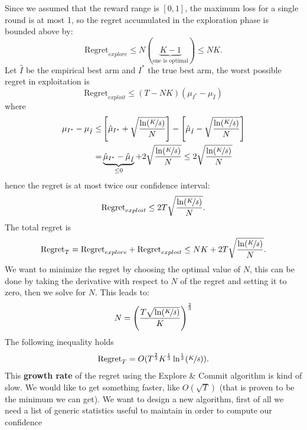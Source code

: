 \documentclass[10pt, a4paper]{report}
\begin{document}
Since we assumed that the reward range is $[0,1]$, the maximum loss for a single round is at most 1, so the regret accumulated in the exploration phase is bounded above by:\begin{equation}
     \text{Regret}_{explore}\le N(\underbrace{K-1}_{\text{one is optimal}})\le NK.
\end{equation}
Let $\hat I$ be the empirical best arm and $I^*$ the true best arm, the worst possible regret in exploitation is\begin{equation}
    \text{Regret}_{exploit}\le (T-NK)(\mu_{I^*}-\mu_{\hat I})
\end{equation}
where\begin{align}
    \mu_{I^*}-\mu_{\hat I}\le&
    \left[\hat \mu_{I^*}+\sqrt{\frac{\ln(\nicefrac{K}{\delta})}{N}}\right]-
     \left[\hat \mu_{\hat I}-\sqrt{\frac{\ln(\nicefrac{K}{\delta})}{N}}\right]\\ 
     =&\underbrace{\hat\mu_{I^*}-\hat\mu_{\hat I}}_{\le 0}+2\sqrt{\frac{\ln(\nicefrac{K}{\delta})}{N}}\le 2\sqrt{\frac{\ln(\nicefrac{K}{\delta})}{N}}
\end{align}
hence the regret is at most twice our confidence interval:\begin{equation}
    \text{Regret}_{exploit}\le2T\sqrt{\frac{\ln(\nicefrac{K}{\delta})}{N}}.
\end{equation}
The total regret is\begin{equation}
    \text{Regret}_T= \text{Regret}_{explore}+\text{Regret}_{exploit}\le NK+2T\sqrt{\frac{\ln(\nicefrac{K}{\delta})}{N}}.
\end{equation}
We want to minimize the regret by choosing the optimal value of $N$, this can be done by taking the derivative with respect to $N$ of the regret and setting it to zero, then we solve for $N$. This leads to:\begin{equation}
    N=\left(
        \frac{T\sqrt{\ln(\nicefrac{K}{\delta})}}{K}
    \right)^\frac{2}{3}
\end{equation}
The following inequality holds\begin{equation}
    \text{Regret}_T= O(T^\frac{2}{3}K^\frac{1}{3}\ln^\frac{1}{3}(\nicefrac{K}{\delta})).
\end{equation}
This \textbf{growth rate} of the regret using the Explore \& Commit algorithm is kind of slow. We would like to get something faster, like $O(\sqrt{T})$ (that is proven to be the minimum we can get). We want to design a new algorithm, first of all we need a list of generic statistics useful to maintain in order to compute our confidence
\end{document}
